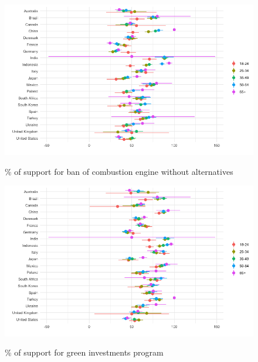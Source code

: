 \begin{frame}{}%
\begin{figure}[h!]
\caption{\% of support for ban of combustion engine without alternatives} %
\includegraphics[width=.7\paperwidth]{../figures/country_comparison/standard_support_age_each_country.png} \\
\end{figure}
\end{frame}

\begin{frame}{}%
\begin{figure}[h!]
\caption{\% of support for green investments program} %
\includegraphics[width=.7\paperwidth]{../figures/country_comparison/investments_support_age_each_country.png} \\
\end{figure}
\end{frame}


